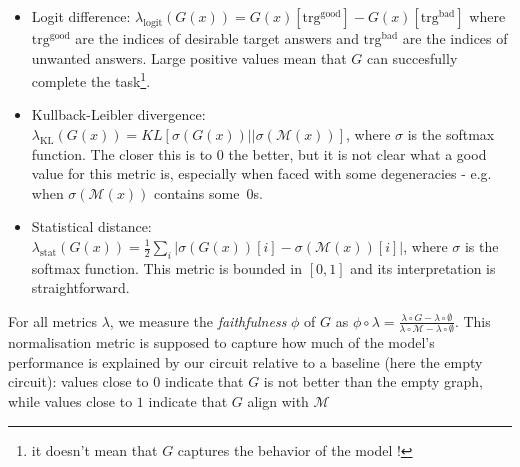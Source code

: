 \documentclass{article}
\begin{document}
\begin{itemize}
    \item Logit difference: $\lambda_{\mathrm{logit}}(G(x)) = G(x)[\mathrm{trg}^{\mathrm{good}}] - G(x)[\mathrm{trg}^{\mathrm{bad}}]$ where $\mathrm{trg}^{\mathrm{good}}$ are the indices of desirable target answers and $\mathrm{trg}^{\mathrm{bad}}$ are the indices of unwanted answers. Large positive values mean that $G$ can succesfully complete the task\footnote{it doesn't mean that $G$ captures the behavior of the model !}.
    \item Kullback-Leibler divergence: $\lambda_{\mathrm{KL}}(G(x)) = KL[\sigma\left(G(x)\right) || \sigma\left(\mathcal{M}(x)\right)]$, where $\sigma$ is the softmax function. The closer this is to 0 the better, but it is not clear what a good value for this metric is, especially when faced with some degeneracies - e.g. when $\sigma\left(\mathcal{M}(x)\right)$ contains some~$0$s.
    \item Statistical distance: $\lambda_{\mathrm{stat}}(G(x)) = \frac{1}{2}\sum_{i}|\sigma\left(G(x)\right)[i] - \sigma\left(\mathcal{M}(x)\right)[i]|$, where $\sigma$ is the softmax function. This metric is bounded in $[0, 1]$ and its interpretation is straightforward.
\end{itemize}

For all metrics $\lambda$, we measure the \emph{faithfulness} $\phi$ of $G$ as $\phi \circ \lambda = \frac{\lambda \circ G - \lambda \circ \emptyset}{\lambda \circ \mathcal{M} - \lambda \circ \emptyset}$. This normalisation metric is supposed to capture how much of the model's performance is explained by our circuit relative to a baseline (here the empty circuit): values close to $0$ indicate that $G$ is not better than the empty graph, while values close to $1$ indicate that $G$ align with $\mathcal{M}$
\end{document}
